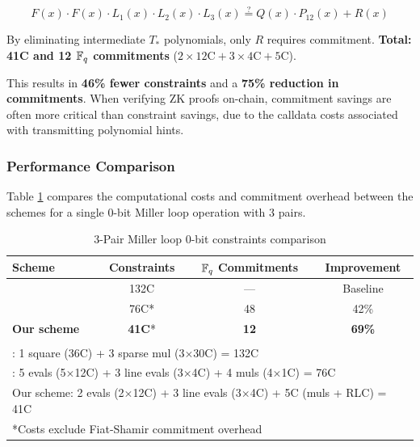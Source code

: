 $$F(x) \cdot F(x) \cdot L_1(x) \cdot L_2(x) \cdot L_3(x) \stackrel{?}{=} Q(x) \cdot P_{12}(x) + R(x)$$

By eliminating intermediate $T_*$ polynomials, only $R$ requires commitment. \textbf{Total: 41C and 12 $\mathbb{F}_q$ commitments} ($2 \times 12\text{C} + 3 \times 4\text{C} + 5\text{C}$).

\hspace{0cm}

This results in \textbf{46\% fewer constraints} and a \textbf{75\% reduction in commitments}. When verifying ZK proofs on-chain, commitment savings are often more critical than constraint savings, due to the calldata costs associated with transmitting polynomial hints.


\subsubsection{Performance Comparison}

Table \ref{tab:miller_loop_comparison} compares the computational costs and commitment overhead between the schemes for a single 0-bit Miller loop operation with 3 pairs.

\begin{table}[h]
\centering
\caption{3-Pair Miller loop 0-bit constraints comparison}
\label{tab:miller_loop_comparison}
\begin{tabular}{|l|c|c|c|}
\hline
\textbf{Scheme} & \textbf{Constraints} & \textbf{$\mathbb{F}_q$ Commitments} & \textbf{Improvement} \\
\hline
\cite{ACNS:ElHousni23} & 132C & --- & Baseline \\
\hline
\cite{FXFM23} & 76C* & 48 & 42\% \\
\hline
\textbf{Our scheme} & \textbf{41C}* & \textbf{12} & \textbf{69\%} \\
\hline
\multicolumn{4}{|c|}{} \\
\multicolumn{4}{|l|}{\cite{ACNS:ElHousni23}: 1 square (36C) + 3 sparse mul (3$\times$30C) = 132C} \\
\multicolumn{4}{|l|}{\cite{FXFM23}: 5 evals (5$\times$12C) + 3 line evals (3$\times$4C) + 4 muls (4$\times$1C) = 76C} \\
\multicolumn{4}{|l|}{Our scheme: 2 evals (2$\times$12C) + 3 line evals (3$\times$4C) + 5C (muls + RLC) = 41C} \\
\multicolumn{4}{|l|}{*Costs exclude Fiat-Shamir commitment overhead} \\
\hline
\end{tabular}
\end{table}


